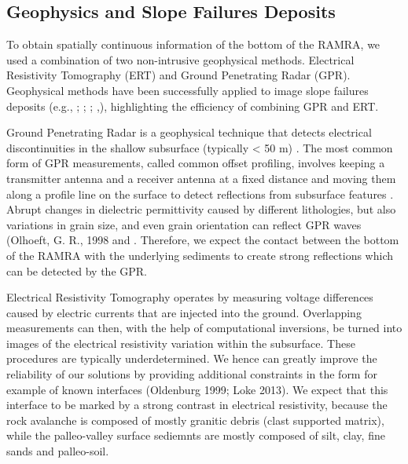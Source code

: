 \documentclass[5p]{elsarticle}
\begin{document}


\bigskip

                 
                 
\subsection{Geophysics and Slope Failures Deposits}

To obtain spatially continuous information of the bottom of the RAMRA, we used a combination of two non-intrusive geophysical methods. Electrical Resistivity Tomography (ERT) and Ground Penetrating Radar (GPR). Geophysical methods have been successfully applied to image slope failures deposits (e.g., \cite{sass2006determination}; \cite{otto2006comparing}; \cite{socco2010geophysical}; \cite{brody2015near},\cite{liu2018near}), highlighting the efficiency of combining GPR and ERT.
                 
Ground Penetrating Radar is a geophysical technique that detects electrical discontinuities in the shallow subsurface (typically < 50 m) \citep{neal2004ground}. The most common form of GPR measurements, called common offset profiling, involves keeping a transmitter antenna and a receiver antenna at a fixed distance and moving them along a profile line on the surface to detect reflections from subsurface features \citep{jol2008ground}. Abrupt changes in dielectric permittivity caused by different lithologies, but also variations in grain size, and even grain orientation can reflect GPR waves (Olhoeft, G. R., 1998 and \citep{neal2004ground}. Therefore, we expect the contact between the bottom of the RAMRA with the underlying sediments to create strong reflections which can be detected by the GPR.          

Electrical Resistivity Tomography operates by measuring voltage differences caused by electric currents that are injected into the ground. Overlapping measurements can then, with the help of computational inversions, be turned into images of the electrical resistivity variation within the subsurface. These procedures are typically underdetermined. We hence can greatly improve the reliability of our solutions by providing additional constraints in the form for example of known interfaces (Oldenburg 1999; Loke 2013). We expect that this interface to be marked by a strong contrast in electrical resistivity, because the rock avalanche is composed of mostly granitic debris (clast supported matrix), while the palleo-valley surface sediemnts are mostly composed of silt, clay, fine sands and palleo-soil. 
\end{document}
